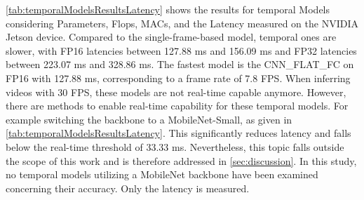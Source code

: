 \clearpage

\noindent\autoref{tab:temporalModelsResultsLatency} shows the results for temporal Models considering Parameters, Flops, MACs, and the Latency measured on the NVIDIA Jetson device.
Compared to the single-frame-based model, temporal ones are slower, with FP16 latencies between 127.88 ms and 156.09 ms and FP32 latencies between 223.07 ms and 328.86 ms.
The fastest model is the CNN\_FLAT\_FC on FP16 with 127.88 ms, corresponding to a frame rate of 7.8 \ac{FPS}.
When inferring videos with 30 \ac{FPS}, these models are not real-time capable anymore.
However, there are methods to enable real-time capability for these temporal models.
For example switching the backbone to a MobileNet-Small, as given in \autoref{tab:temporalModelsResultsLatency}.
This significantly reduces latency and falls below the real-time threshold of 33.33 ms.
Nevertheless, this topic falls outside the scope of this work and is therefore addressed in \autoref{sec:discussion}.
In this study, no temporal models utilizing a MobileNet backbone have been examined concerning their accuracy.
Only the latency is measured.